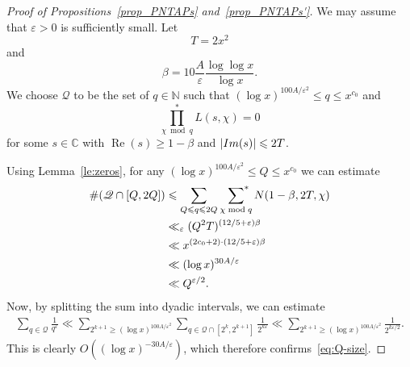 \documentclass[11pt,letterpaper]{amsart}
\renewcommand{\leq}{\leqslant}
\renewcommand{\geq}{\geqslant}
\theoremstyle{definition}
\numberwithin{equation}{section}
\newcommand\NN{\mathbb{N}}
\newcommand{\asum}{\sideset{}{^{\ast}}\sum}
\DeclareMathOperator{\real}{Re}
\newcommand{\0}{\mathbf{0}}
\begin{document}
\begin{proof}[Proof of Propositions~\ref{prop_PNTAPs} and~\ref{prop_PNTAPs'}] We may assume that $\varepsilon>0$ is sufficiently small.
Let $$
 T=2x^2$$ and    
\begin{equation*}
\beta=10\frac{A}{\varepsilon}\frac{\log \log x}{\log x}.
\end{equation*}
We choose $\mathcal{Q}$ to be the set of $q\in \NN$ such that  
$(\log x)^{100A/\varepsilon^2}\leq q\leq x^{c_0}$ and 
$$\prod^*_{\chi\bmod q}L(s,\chi)= 0$$ for some $s\in \mathbb{C}$ with $\real(s)\geq 1-\beta$ and $|\textnormal{Im(s)}|\leq 2T$.

Using Lemma~\ref{le:zeros}, for any $(\log x)^{100A/\varepsilon^2}\leq Q\leq x^{c_0}$ we can  estimate
 \begin{align*}
\#(\mathcal{Q}\cap [Q,2Q])&\leq \sum_{Q\leq q\leq 2Q}\,\,\asum_{\chi\bmod q}N(1-\beta,2T,\chi)\\
&\ll_{\varepsilon} (Q^2T)^{(12/5+\varepsilon)\beta}\\
&\ll x^{(2c_0+2)\cdot (12/5+\varepsilon)\beta}\\
&\ll (\log x)^{30A/\varepsilon}\\
&\ll Q^{\varepsilon/2}.    
\end{align*}
 Now, by splitting the sum into dyadic intervals, we can estimate
 \begin{align*}
    \sum_{q\in \mathcal{Q}}\frac{1}{q^{\varepsilon}}\ll \sum_{2^{k+1}\geq (\log x)^{100A/\varepsilon^2}} \sum_{q\in \mathcal{Q}\cap [2^k,2^{k+1}]}\frac{1}{2^{k\varepsilon}}\ll \sum_{2^{k+1}\geq (\log x)^{100A/\varepsilon^2}} 
    \frac{1}{2^{k\varepsilon/2}}.
 \end{align*}
This is clearly $O((\log x)^{-30A/\varepsilon})$, which  therefore confirms~\eqref{eq:Q-size}.


\end{proof}
\end{document}
